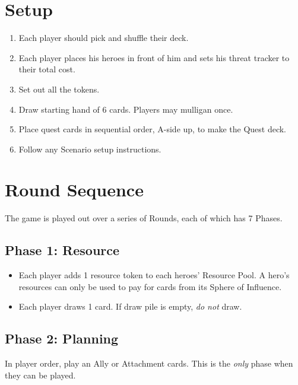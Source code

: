 \documentclass[12pt]{article}
\newenvironment{enumerateCustom}
{\begin{enumerate}
  \setlength{\itemsep}{1pt}
  \setlength{\parskip}{0pt}
  \setlength{\parsep}{0pt}}
{\end{enumerate}}
\newenvironment{itemizeCustom}
{\begin{itemize}
  \setlength{\itemsep}{1pt}
  \setlength{\parskip}{0pt}
  \setlength{\parsep}{0pt}}
{\end{itemize}}
\begin{document}
\begin{mdframed}[style = customFrame]
\begin{multicols*}{2}

\section*{Setup}
\begin{enumerateCustom}
	\item Each player should pick and shuffle their deck.
	\item Each player places his heroes in front of him and sets his threat tracker to their total cost.
	\item Set out all the tokens.
	\item Draw starting hand of 6 cards. Players may mulligan once.
	\item Place quest cards in sequential order, A-side up, to make the Quest deck.
	\item Follow any Scenario setup instructions.
\end{enumerateCustom}

\section*{Round Sequence}
The game is played out over a series of Rounds, each of which has 7 Phases.

\subsection*{Phase 1: Resource}
\begin{itemizeCustom}
	\item Each player adds 1 resource token to each heroes' Resource Pool. A hero's resources can only be used to pay for cards from its Sphere of Influence.
	\item Each player draws 1 card. If draw pile is empty, \emph{do not} draw.
\end{itemizeCustom}

\subsection*{Phase 2: Planning}
In player order, play an Ally or Attachment cards. This is the \emph{only} phase when they can be played.


\end{multicols*}
\end{mdframed}
\end{document}
